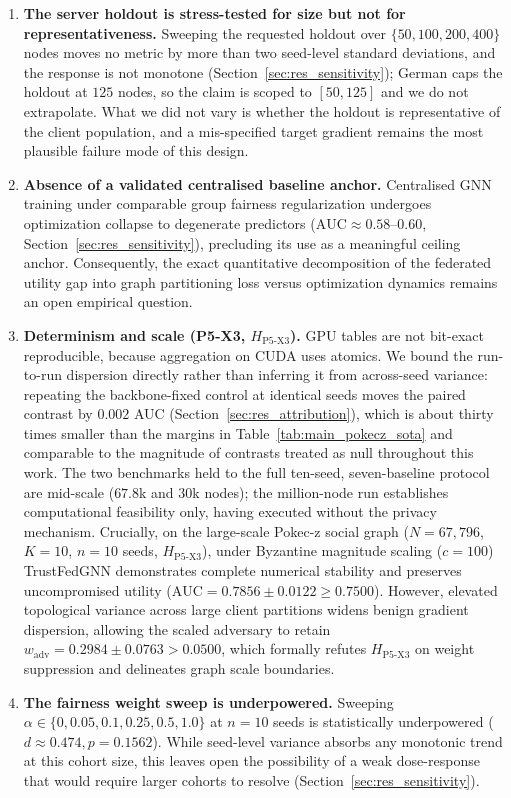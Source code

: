\documentclass[preprint,12pt]{elsarticle}
\theoremstyle{plain}
\theoremstyle{definition}
\theoremstyle{remark}
\begin{document}
\begin{enumerate}
\item \textbf{The server holdout is stress-tested for size but not for representativeness.} Sweeping the requested holdout over $\{50, 100, 200, 400\}$ nodes moves no metric by more than two seed-level standard deviations, and the response is not monotone (Section~\ref{sec:res_sensitivity}); German caps the holdout at $125$ nodes, so the claim is scoped to $[50, 125]$ and we do not extrapolate. What we did not vary is whether the holdout is representative of the client population, and a mis-specified target gradient remains the most plausible failure mode of this design.

\item \textbf{Absence of a validated centralised baseline anchor.} Centralised GNN training under comparable group fairness regularization undergoes optimization collapse to degenerate predictors ($\mathrm{AUC} \approx 0.58$--$0.60$, Section~\ref{sec:res_sensitivity}), precluding its use as a meaningful ceiling anchor. Consequently, the exact quantitative decomposition of the federated utility gap into graph partitioning loss versus optimization dynamics remains an open empirical question.

\item \textbf{Determinism and scale (P5-X3, $H_{\text{P5-X3}}$).} GPU tables are not bit-exact reproducible, because aggregation on CUDA uses atomics. We bound the run-to-run dispersion directly rather than inferring it from across-seed variance: repeating the backbone-fixed control at identical seeds moves the paired contrast by $0.002$ AUC (Section~\ref{sec:res_attribution}), which is about thirty times smaller than the margins in Table~\ref{tab:main_pokecz_sota} and comparable to the magnitude of contrasts treated as null throughout this work. The two benchmarks held to the full ten-seed, seven-baseline protocol are mid-scale ($67.8$k and $30$k nodes); the million-node run establishes computational feasibility only, having executed without the privacy mechanism. Crucially, on the large-scale Pokec-z social graph ($N=67{,}796$, $K=10$, $n=10$ seeds, $H_{\text{P5-X3}}$), under Byzantine magnitude scaling ($c=100$) TrustFedGNN demonstrates complete numerical stability and preserves uncompromised utility ($\mathrm{AUC} = 0.7856 \pm 0.0122 \ge 0.7500$). However, elevated topological variance across large client partitions widens benign gradient dispersion, allowing the scaled adversary to retain $w_{\mathrm{adv}} = 0.2984 \pm 0.0763 > 0.0500$, which formally refutes $H_{\text{P5-X3}}$ on weight suppression and delineates graph scale boundaries.

\item \textbf{The fairness weight sweep is underpowered.} Sweeping $\alpha \in \{0, 0.05, 0.1, 0.25, 0.5, 1.0\}$ at $n=10$ seeds is statistically underpowered ($d \approx 0.474, p=0.1562$). While seed-level variance absorbs any monotonic trend at this cohort size, this leaves open the possibility of a weak dose-response that would require larger cohorts to resolve (Section~\ref{sec:res_sensitivity}).
\end{enumerate}
\end{document}

